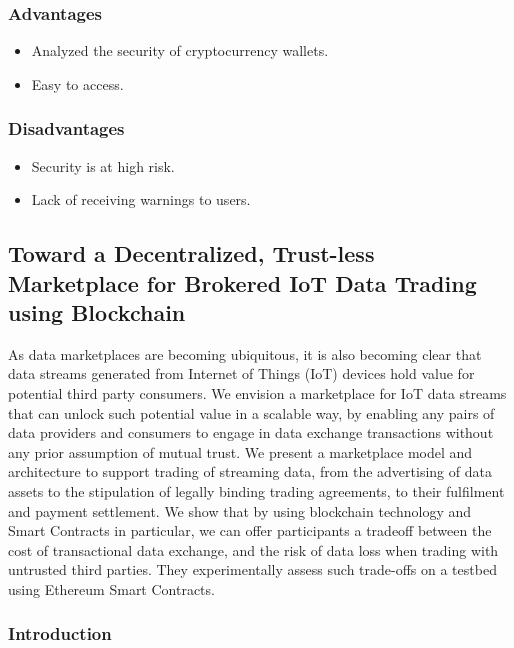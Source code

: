 \documentclass[12pt]{article}
\begin{document}
\newpage
\newpage
\subsubsection{Advantages}
\begin{itemize}
\item Analyzed the security of cryptocurrency wallets.
\item Easy to access.

\end{itemize}
\vspace{10px}
\subsubsection{Disadvantages}
\begin{itemize}
\item Security is at high risk.
\item Lack of receiving warnings to users.
\end{itemize}




\newpage
\subsection{Toward a Decentralized, Trust-less Marketplace for Brokered IoT Data
Trading using Blockchain}
\vspace*{10px}


 As data marketplaces are becoming ubiquitous,
it is also becoming clear that data streams generated from
Internet of Things (IoT) devices hold value for potential third
party consumers. We envision a marketplace for IoT data
streams that can unlock such potential value in a scalable
way, by enabling any pairs of data providers and consumers
to engage in data exchange transactions without any prior
assumption of mutual trust. We present a marketplace model
and architecture to support trading of streaming data, from
the advertising of data assets to the stipulation of legally
binding trading agreements, to their fulfilment and payment
settlement. We show that by using blockchain technology and
Smart Contracts in particular, we can offer participants a tradeoff between the cost of transactional data exchange, and the
risk of data loss when trading with untrusted third parties.
They experimentally assess such trade-offs on a testbed using
Ethereum Smart Contracts.

\subsubsection{Introduction}
\end{document}
